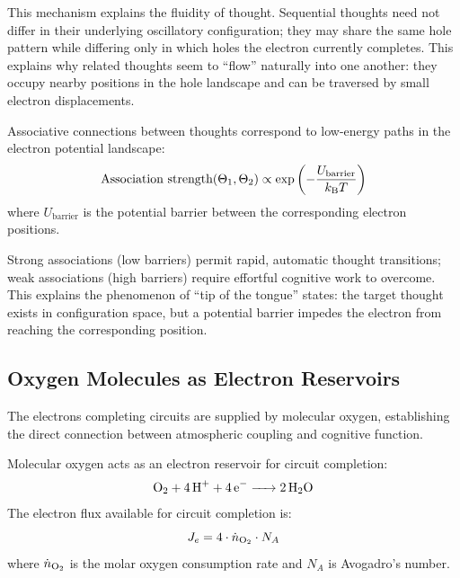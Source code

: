 This mechanism explains the fluidity of thought. Sequential thoughts need not differ in their underlying oscillatory configuration; they may share the same hole pattern while differing only in which holes the electron currently completes. This explains why related thoughts seem to ``flow'' naturally into one another: they occupy nearby positions in the hole landscape and can be traversed by small electron displacements.

\begin{corollary}
\label{cor:associative}
Associative connections between thoughts correspond to low-energy paths in the electron potential landscape:
\begin{equation}
\text{Association strength}(\Theta_1, \Theta_2) \propto \exp\left(-\frac{U_{\text{barrier}}}{k_{\mathrm{B}} T}\right)
\label{eq:association_strength}
\end{equation}
where $U_{\text{barrier}}$ is the potential barrier between the corresponding electron positions.
\end{corollary}

Strong associations (low barriers) permit rapid, automatic thought transitions; weak associations (high barriers) require effortful cognitive work to overcome. This explains the phenomenon of ``tip of the tongue'' states: the target thought exists in configuration space, but a potential barrier impedes the electron from reaching the corresponding position.

\subsection{Oxygen Molecules as Electron Reservoirs}

The electrons completing circuits are supplied by molecular oxygen, establishing the direct connection between atmospheric coupling and cognitive function.

\begin{theorem}
\label{thm:oxygen_electron}
Molecular oxygen acts as an electron reservoir for circuit completion:
\begin{equation}
\ce{O2 + 4H+ + 4e- -> 2H2O}
\label{eq:oxygen_reduction}
\end{equation}
The electron flux available for circuit completion is:
\begin{equation}
J_e = 4 \cdot \dot{n}_{\ce{O2}} \cdot N_A
\label{eq:electron_flux}
\end{equation}
where $\dot{n}_{\ce{O2}}$ is the molar oxygen consumption rate and $N_A$ is Avogadro's number.
\end{theorem}


